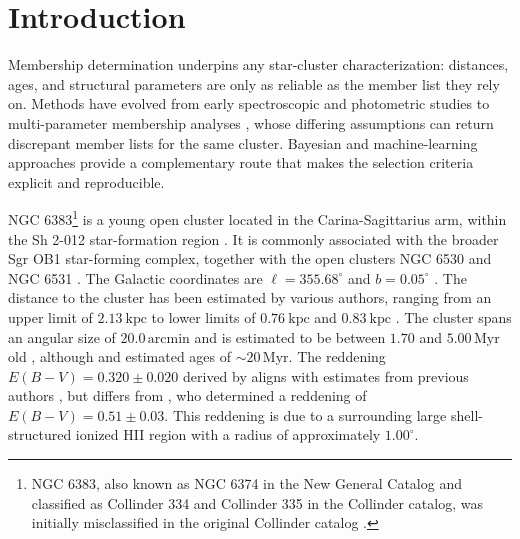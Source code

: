 \documentclass{aa}
\begin{document}


   \maketitle
\nolinenumbers

\section{Introduction}\label{S_intro}
Membership determination underpins any star-cluster characterization: distances, ages, and structural parameters are only as reliable as the member list they rely on. Methods have evolved from early spectroscopic and photometric studies \citep[e.g.,][]{1930LicOB..14..154T,1949ApJ...110..117S,1968ArA.....5....1L,1978MNRAS.182..607F} to multi-parameter membership analyses \citep{1989MNRAS.236..263P,1991MNRAS.249...76B,2005AA...438.1163K,2007AA...462..157P,2018AA...610A..30A}, whose differing assumptions can return discrepant member lists for the same cluster. Bayesian and machine-learning approaches provide a complementary route that makes the selection criteria explicit and reproducible.

NGC 6383\footnote{NGC 6383, also known as NGC 6374 in the New General Catalog \citep{2008hsf2.book..497R} and classified as Collinder 334 and Collinder 335 in the Collinder catalog, was initially misclassified in the original Collinder catalog \citep{1931AnLun...2....1C}.} is a young open cluster located in the Carina-Sagittarius arm, within the Sh 2-012 star-formation region \citep{1959ApJS....4..257S}. It is commonly associated with the broader Sgr OB1 star-forming complex, together with the open clusters NGC 6530 and NGC 6531 \citep{2008hsf2.book..497R}. The Galactic coordinates are $\ell = 355.68^{\circ}$ and $b = 0.05^{\circ}$ \citep{2017A&A...600A.106C}. The distance to the cluster has been estimated by various authors, ranging from an upper limit of $2.13~\mathrm{kpc}$ \citep{1930LicOB..14..154T} to lower limits of $0.76~\mathrm{kpc}$ \citep{1949ApJ...110..117S} and $0.83~\mathrm{kpc}$ \citep{2018AA...610A..30A}. The cluster spans an angular size of $20.0\,\mathrm{arcmin}$ \citep{2013A&A...560A..76M} and is estimated to be between $1.70$ and $5.00\,\mathrm{Myr}$ old \citep{1978MNRAS.182..607F,1989MNRAS.236..263P,2005AA...438.1163K,2007AA...462..157P}, although \citet{1968ArA.....5....1L} and \citet{1991MNRAS.249...76B} estimated ages of $\sim20\,\mathrm{Myr}$. The reddening $E(B-V) = 0.320 \pm 0.020$ derived by \citet{2008hsf2.book..497R} aligns with estimates from previous authors \citep{1971AAS....4..241B,1978MNRAS.182..607F,1978MNRAS.184..661L,1985AA...151..391T,1989MNRAS.236..263P,1994RMxAA..29..141F,2007AA...462..157P}, but differs from \citet{2018AA...610A..30A}, who determined a reddening of $E(B-V) = 0.51 \pm 0.03$. This reddening is due to a surrounding large shell-structured ionized HII region with a radius of approximately $1.00^{\circ}$.
\end{document}
